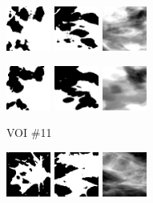 \documentclass[journal]{IEEEtran}
\begin{document}
\begin{figure}[!htb]
  \includegraphics[width=0.13\textwidth]
  {figure/all/dataset_7/roi_coronal}
  \includegraphics[width=0.13\textwidth]
  {figure/all/dataset_7/roi_saggital}
  \includegraphics[width=0.13\textwidth]
  {figure/all/dataset_7/proj_roi}

  \includegraphics[width=0.13\textwidth]
  {figure/all/dataset_7/model_coronal}
  \includegraphics[width=0.13\textwidth]
  {figure/all/dataset_7/model_saggital}
  \includegraphics[width=0.13\textwidth]
  {figure/all/dataset_7/proj_roi_inten10}

  {\fontsize{9}{9}\selectfont VOI \#11} \vspace{1mm}

  \includegraphics[width=0.13\textwidth]
  {figure/all/dataset_11/roi_coronal}
  \includegraphics[width=0.13\textwidth]
  {figure/all/dataset_11/roi_saggital}
  \includegraphics[width=0.13\textwidth]
  {figure/all/dataset_11/proj_roi}


\end{figure}
\end{document}
